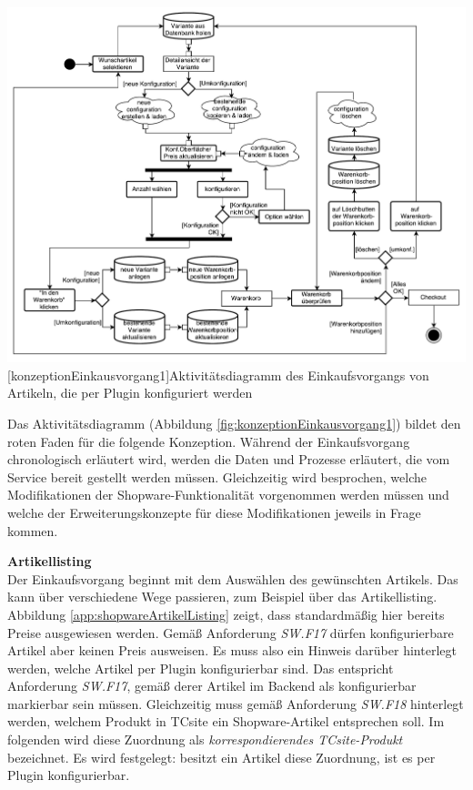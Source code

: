 \documentclass[12pt,a4paper,bibliography=totocnumbered,listof=totoc]{scrartcl}
\begin{document}
\vspace{1em}
\begin{minipage}{\linewidth}
	\centering
	\includegraphics[width=1\linewidth]{Abbildungen/konzeptionEinkausvorgang1.pdf}
	[konzeptionEinkausvorgang1]{Aktivitätsdiagramm des Einkaufsvorgangs von Artikeln, die per Plugin konfiguriert werden}
	\label{fig:konzeptionEinkausvorgang1}
\end{minipage}
\vspace{1em}

Das Aktivitätsdiagramm (Abbildung \ref{fig:konzeptionEinkausvorgang1}) bildet den \glqq roten Faden\grqq{} für die folgende Konzeption. Während der Einkaufsvorgang chronologisch erläutert wird, werden die Daten und Prozesse erläutert, die vom Service bereit gestellt werden müssen. Gleichzeitig wird besprochen, welche Modifikationen der Shopware-Funktionalität vorgenommen werden müssen und welche der Erweiterungskonzepte für diese Modifikationen jeweils in Frage kommen.

\textbf{Artikellisting}\\
Der Einkaufsvorgang beginnt mit dem Auswählen des gewünschten Artikels. Das kann über verschiedene Wege passieren, zum Beispiel über das Artikellisting. Abbildung \ref{app:shopwareArtikelListing} zeigt, dass standardmäßig hier bereits Preise ausgewiesen werden. Gemäß Anforderung \emph{SW.F17} dürfen konfigurierbare Artikel aber keinen Preis ausweisen. Es muss also ein Hinweis darüber hinterlegt werden, welche Artikel per Plugin konfigurierbar sind. Das entspricht Anforderung \emph{SW.F17}, gemäß derer Artikel im Backend als konfigurierbar markierbar sein müssen. Gleichzeitig muss gemäß Anforderung \emph{SW.F18} hinterlegt werden, welchem Produkt in TCsite ein Shopware-Artikel entsprechen soll. Im folgenden wird diese Zuordnung als \emph{korrespondierendes TCsite-Produkt} bezeichnet. Es wird festgelegt: besitzt ein Artikel diese Zuordnung, ist es per Plugin konfigurierbar.
\end{document}
